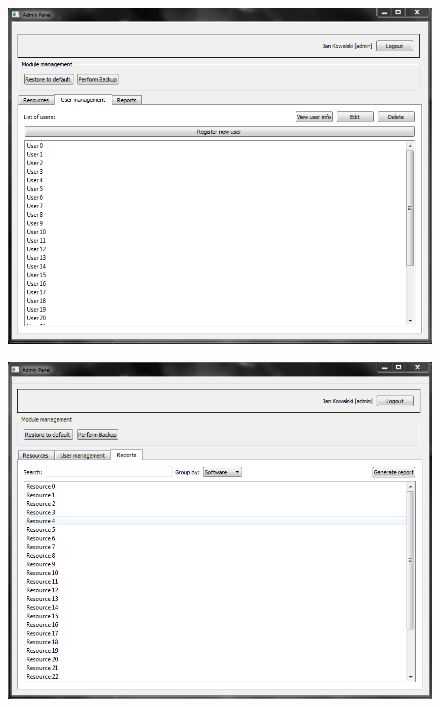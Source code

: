 \documentclass[11pt, a4paper, oneside]{report}
\begin{document}
\begin{figure}[H]
\centering
\includegraphics[scale=0.45]{admin_panel_user_management.png}
\end{figure}

\begin{figure}[H]
\centering
\includegraphics[scale=0.45]{admin_panel_reports.png}
\end{figure}
\end{document}
